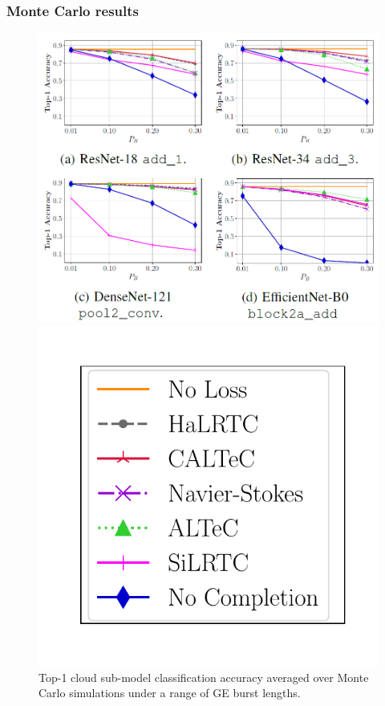 \documentclass[aspectratio=169]{beamer}
\begin{document}
\begin{frame}
	\frametitle{Monte Carlo results}
		\begin{figure}
		\begin{minipage}{0.68\textwidth}
			\includegraphics[width=\linewidth]{mcresults.png}
		\end{minipage}\hfill
		\begin{minipage}{0.28\textwidth}
			\includegraphics[width=\linewidth]{default_lp_accumulated_vcip_legend.pdf}
		\end{minipage}
		\caption{Top-1 cloud sub-model classification accuracy averaged over Monte Carlo simulations under a range of GE burst lengths.}
	\end{figure}
\end{frame}
\end{document}
